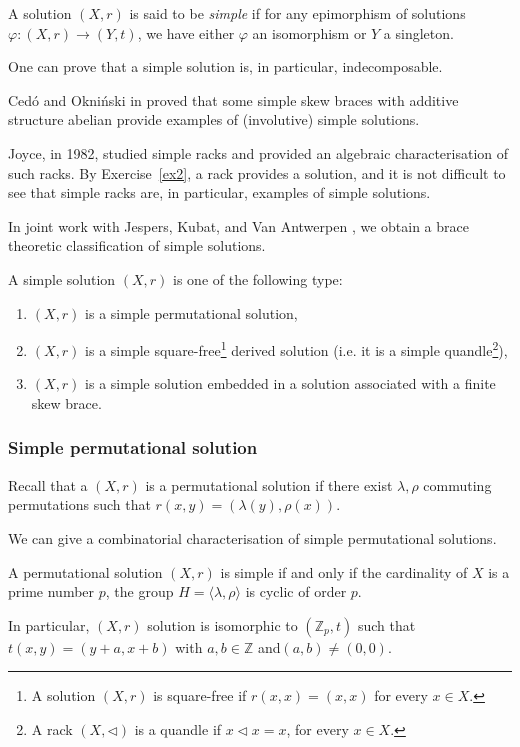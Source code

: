 \begin{definition}
    A solution $(X,r)$ is said to be \emph{simple} if for any epimorphism of solutions $\varphi: (X,r) \to (Y,t)$, we have either $\varphi$ an isomorphism or $Y$ a singleton.
\end{definition}

One can prove that a simple solution is, in particular, indecomposable. 

Cedó and Okniński in \cite{MR4391683} proved that some simple skew braces with additive structure abelian provide examples of (involutive) simple solutions. 

Joyce, in 1982, studied simple racks and provided an algebraic characterisation of such racks. By Exercise~\ref{ex2}, a rack provides a solution, and it is not difficult to see that simple racks are, in particular, examples of simple solutions. 

In joint work with Jespers, Kubat, and Van Antwerpen \cite{colazzo2023simple}, we obtain a brace theoretic classification of simple solutions. 

\begin{theorem}
    A simple solution $(X,r)$ is one of the following type:
    \begin{enumerate}
        \item $(X,r)$ is a simple permutational solution,
        \item $(X,r)$ is a simple square-free\footnote{A solution $(X,r)$ is square-free if $r(x,x)=(x,x)$ for every $x\in X$.} derived solution (i.e. it is a simple quandle\footnote{A rack $(X,\triangleleft)$ is a quandle if $x\triangleleft x = x$, for every $x\in X$.}),
        \item $(X,r)$ is a simple solution embedded in a solution associated with a finite skew brace. 
    \end{enumerate}
\end{theorem}

\subsubsection{Simple permutational solution}

Recall that a $(X,r)$ is a permutational solution if there exist $\lambda,\rho$ commuting permutations such that $r(x,y)=(\lambda(y),\rho(x))$.

We can give a combinatorial characterisation of simple permutational solutions.

\begin{proposition}
    A permutational solution $(X,r)$ is simple if and only if the cardinality of $X$ is a prime number $p$, the group $H=\langle\lambda,\rho\rangle$ is cyclic of order $p$.

    In particular, $(X,r)$ solution is isomorphic to $(\mathbb{Z}_p,t)$ such that $t(x,y)= (y+a,x+b)$ with $a,b\in \mathbb{Z}$ and$(a,b)\neq (0,0)$.
\end{proposition}

